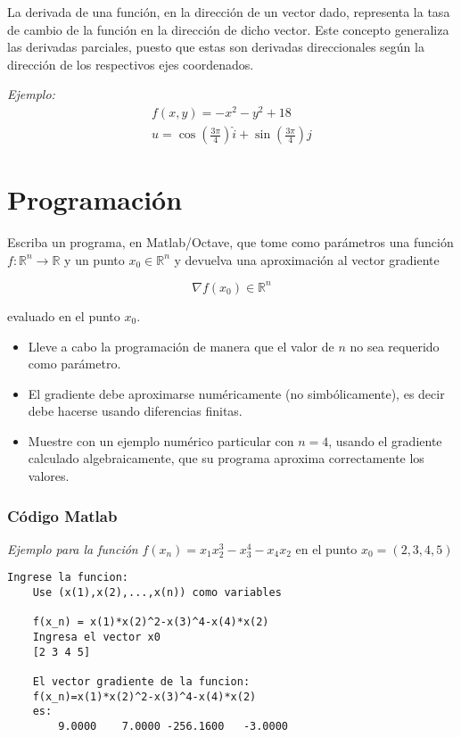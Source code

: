 \documentclass[12pt,oneside]{book}
\begin{document}
La derivada de una función, en la dirección de un vector dado, representa la
tasa de cambio de la función en la dirección de dicho vector. Este concepto
generaliza las derivadas parciales, puesto que estas son derivadas direccionales
según la dirección de los respectivos ejes coordenados.

\textit{Ejemplo:}
\begin{gather*}
    f(x,y) = -x^2-y^2+18  \\
    u = \cos{\left(\frac{3\pi}{4}\right)} \hat{i} + \sin{\left( \frac{3 \pi}{4}\right)} \hat{j}
\end{gather*}

\chapter{Programación}

{\large Escriba un programa, en Matlab/Octave, que tome como parámetros una función $f: \mathbb{R}^n \rightarrow \mathbb{R}$ y un punto $x_0 \in \mathbb{R}^n$ y devuelva una aproximación al vector gradiente 

\begin{equation*}
    \nabla f(x_0) \in \mathbb{R}^n
\end{equation*}

evaluado en el punto $x_0$.}

\begin{itemize}
    \item Lleve a cabo la programación de manera que el valor de $n$ no sea requerido
    como parámetro.
    \item El gradiente debe aproximarse numéricamente (no simbólicamente), es
    decir debe hacerse usando diferencias finitas.
    \item Muestre con un ejemplo numérico particular con $n = 4$, usando el gradiente calculado algebraicamente, que su programa aproxima correctamente los valores.    
\end{itemize}

\subsection{Código Matlab}

\textit{Ejemplo para la función} $f(x_n) = x_1x_2^3-x_3^4-x_4x_2$ en el punto $x_0 = (2,3,4,5)$
\begin{lstlisting}[frame=single]
    Ingrese la funcion:
    Use (x(1),x(2),...,x(n)) como variables

    f(x_n) = x(1)*x(2)^2-x(3)^4-x(4)*x(2)
    Ingresa el vector x0
    [2 3 4 5]

    El vector gradiente de la funcion:
    f(x_n)=x(1)*x(2)^2-x(3)^4-x(4)*x(2)
    es:
        9.0000    7.0000 -256.1600   -3.0000
\end{lstlisting}
\newpage
\end{document}
